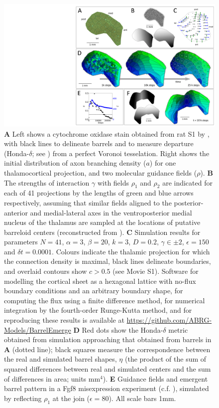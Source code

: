 \documentclass[9pt,twocolumn,twoside,lineno]{pnas-new}
\begin{document}
\begin{figure}
\begin{center}
\includegraphics[width=17.8cm]{./MainFig.png}
\end{center}
\caption{\textbf{A} Left shows a cytochrome oxidase stain obtained from rat S1
  by \cite{zheng_signal_2001}, with black lines to delineate barrels and to
  measure departure (Honda-$\delta$; see \cite{senft_mouse_1991}) from a
  perfect Voronoi tesselation. Right shows the initial distribution of axon
  branching density ($a$) for one thalamocortical projection, and two
  molecular guidance fields ($\rho$). \textbf{B} The strengths of interaction
  $\gamma$ with fields $\rho_1$ and $\rho_2$ are indicated for each of 41
  projections by the lengths of green and blue arrows respectively, assuming
  that similar fields aligned to the posterior-anterior and medial-lateral
  axes in the ventroposterior medial nucleus of the thalamus are sampled at
  the locations of putative barreloid centers (reconstructed from
  \cite{haidarliu_size_2001}). \textbf{C} Simulation results for parameters
  $N=41$, $\alpha=3$, $\beta=20$, $k=3$, $D=0.2$, $\gamma\in\pm 2$,
  $\epsilon=150$ and $\delta{t}=0.0001$. Colours indicate the thalamic
  projection for which the connection density is maximal, black lines
  delineate boundaries, and overlaid contours show $c>0.5$ (see Movie
  S1). Software for modelling the cortical sheet as a hexagonal lattice with
  no-flux boundary conditions and an arbitrary boundary shape, for computing
  the flux using a finite difference method, for numerical integration by the
  fourth-order Runge-Kutta method, and for reproducing these results is
  available at \url{https://github.com/ABRG-Models/BarrelEmerge} \textbf{D} Red
  dots show the Honda-$\delta$ metric obtained from simulation approaching
  that obtained from barrels in \textbf{A} (dotted line); black squares
  measure the correspondence between the real and simulated barrel shapes,
  $\eta$ (the product of the sum of squared differences between real and
  simulated centers and the sum of differences in area; units
  mm$^4$). \textbf{E} Guidance fields and emergent barrel pattern in a Fgf8
  misexpression experiment (c.f. \cite{assimacopoulos_fibroblast_2012}),
  simulated by reflecting $\rho_1$ at the join ($\epsilon=80$). All scale bars
  1mm.}
\label{fig:main}
\end{figure}
\end{document}
